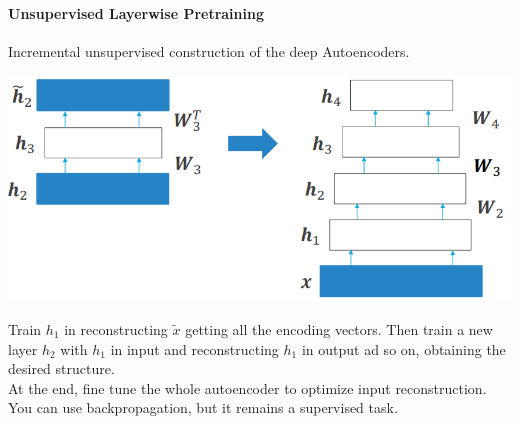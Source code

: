 \documentclass[10pt]{report}
\begin{document}
\paragraph{Unsupervised Layerwise Pretraining} Incremental unsupervised construction of the deep Autoencoders.
\begin{center}
	\includegraphics[scale=0.5]{80.png}
\end{center}
Train $h_1$ in reconstructing $\tilde{x}$ getting all the encoding vectors. Then train a new layer $h_2$ with $h_1$ in input and reconstructing $h_1$ in output ad so on, obtaining the desired structure.\\
At the end, fine tune the whole autoencoder to optimize input reconstruction. You can use backpropagation, but it remains a supervised task.\\
\end{document}
